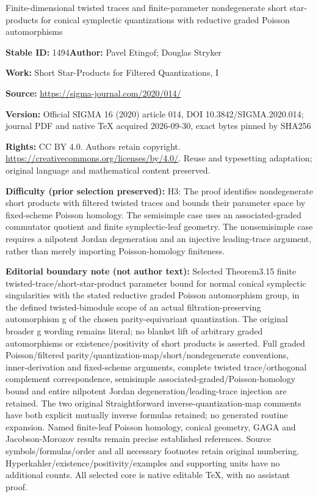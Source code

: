 \documentclass[11pt]{article}
\numberwithin{equation}{section}
\numberwithin{equation}{section}
\begin{document}
\begin{center}\Large Finite-dimensional twisted traces and finite-parameter nondegenerate short star-products for conical symplectic quantizations with reductive graded Poisson automorphisms\end{center}
\noindent\textbf{Stable ID:} 1494\quad\textbf{Author:} Pavel Etingof; Douglas Stryker\par
\noindent\textbf{Work:} Short Star-Products for Filtered Quantizations, I\par
\noindent\textbf{Source:} \url{https://sigma-journal.com/2020/014/}\par
\noindent\textbf{Version:} Official SIGMA 16 (2020) article 014, DOI 10.3842/SIGMA.2020.014; journal PDF and native TeX acquired 2026-09-30, exact bytes pinned by SHA256\par
\noindent\textbf{Rights:} CC BY 4.0. Authors retain copyright. \url{https://creativecommons.org/licenses/by/4.0/}. Reuse and typesetting adaptation; original language and mathematical content preserved.\par
\noindent\textbf{Difficulty (prior selection preserved):} {\CJKfont H3: The proof identifies nondegenerate short products with filtered twisted traces and bounds their parameter space by fixed-scheme Poisson homology. The semisimple case uses an associated-graded commutator quotient and finite symplectic-leaf geometry. The nonsemisimple case requires a nilpotent Jordan degeneration and an injective leading-trace argument, rather than merely importing Poisson-homology finiteness.}\par
\medskip\noindent\textbf{Editorial boundary note (not author text):} Selected Theorem3.15 finite twisted-trace/short-star-product parameter bound for normal conical symplectic singularities with the stated reductive graded Poisson automorphism group, in the defined twisted-bimodule scope of an actual filtration-preserving automorphism g of the chosen parity-equivariant quantization. The original broader g wording remains literal; no blanket lift of arbitrary graded automorphisms or existence/positivity of short products is asserted. Full graded Poisson/filtered parity/quantization-map/short/nondegenerate conventions, inner-derivation and fixed-scheme arguments, complete twisted trace/orthogonal complement correspondence, semisimple associated-graded/Poisson-homology bound and entire nilpotent Jordan degeneration/leading-trace injection are retained. The two original Straightforward inverse-quantization-map comments have both explicit mutually inverse formulas retained; no generated routine expansion. Named finite-leaf Poisson homology, conical geometry, GAGA and Jacobson-Morozov results remain precise established references. Source symbols/formulas/order and all necessary footnotes retain original numbering. Hyperkahler/existence/positivity/examples and supporting units have no additional counts. All selected core is native editable TeX, with no assistant proof.\par
\end{document}
